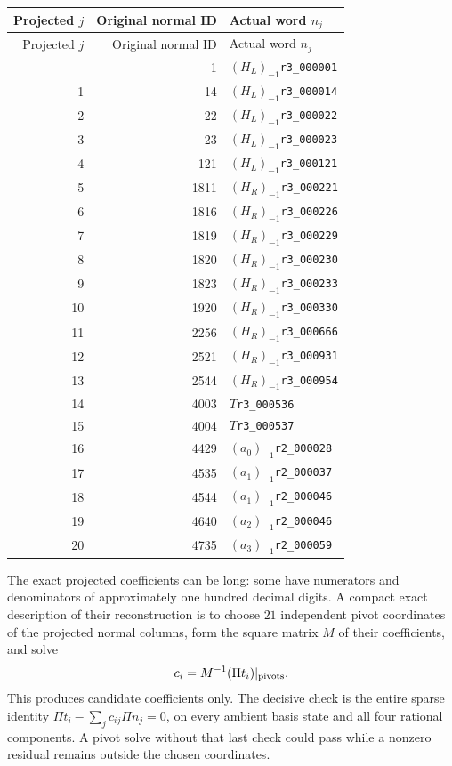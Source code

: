 \begin{longtable}{@{}rrl@{}}
\toprule Projected $j$&Original normal ID&Actual word $n_j$\\\midrule\endfirsthead
\toprule Projected $j$&Original normal ID&Actual word $n_j$\\\midrule\endhead
\bottomrule\endfoot
0 & 1 & $(H_L)_{-1}$\texttt{r3\_000001}\\
1 & 14 & $(H_L)_{-1}$\texttt{r3\_000014}\\
2 & 22 & $(H_L)_{-1}$\texttt{r3\_000022}\\
3 & 23 & $(H_L)_{-1}$\texttt{r3\_000023}\\
4 & 121 & $(H_L)_{-1}$\texttt{r3\_000121}\\
5 & 1811 & $(H_R)_{-1}$\texttt{r3\_000221}\\
6 & 1816 & $(H_R)_{-1}$\texttt{r3\_000226}\\
7 & 1819 & $(H_R)_{-1}$\texttt{r3\_000229}\\
8 & 1820 & $(H_R)_{-1}$\texttt{r3\_000230}\\
9 & 1823 & $(H_R)_{-1}$\texttt{r3\_000233}\\
10 & 1920 & $(H_R)_{-1}$\texttt{r3\_000330}\\
11 & 2256 & $(H_R)_{-1}$\texttt{r3\_000666}\\
12 & 2521 & $(H_R)_{-1}$\texttt{r3\_000931}\\
13 & 2544 & $(H_R)_{-1}$\texttt{r3\_000954}\\
14 & 4003 & $T$\texttt{r3\_000536}\\
15 & 4004 & $T$\texttt{r3\_000537}\\
16 & 4429 & $(a_{0})_{-1}$\texttt{r2\_000028}\\
17 & 4535 & $(a_{1})_{-1}$\texttt{r2\_000037}\\
18 & 4544 & $(a_{1})_{-1}$\texttt{r2\_000046}\\
19 & 4640 & $(a_{2})_{-1}$\texttt{r2\_000046}\\
20 & 4735 & $(a_{3})_{-1}$\texttt{r2\_000059}\\
\end{longtable}
The exact projected coefficients can be long: some have numerators
and denominators of approximately one hundred decimal digits. A compact
exact description of their reconstruction is to choose $21$ independent
pivot coordinates of the projected normal columns, form the square
matrix $M$ of their coefficients, and solve
\[
 c_i=M^{-1}(\Pi t_i)|_{\rm pivots}.
\]
This produces candidate coefficients only. The decisive check is the
entire sparse identity $\Pi t_i-\sum_jc_{ij}\Pi n_j=0$, on every
ambient basis state and all four rational components. A pivot solve
without that last check could pass while a nonzero residual remains
outside the chosen coordinates.

